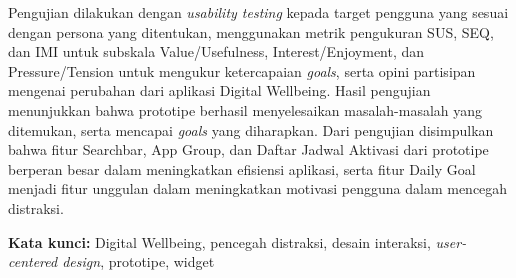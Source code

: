 \begin{singlespace}
  Pengujian dilakukan dengan \textit{usability testing} kepada target pengguna yang sesuai dengan persona yang ditentukan, menggunakan metrik pengukuran SUS, SEQ, dan IMI untuk subskala Value/Usefulness, Interest/Enjoyment, dan Pressure/Tension untuk mengukur ketercapaian \textit{goals}, serta opini partisipan mengenai perubahan dari aplikasi Digital Wellbeing.
  Hasil pengujian menunjukkan bahwa prototipe berhasil menyelesaikan masalah-masalah yang ditemukan, serta mencapai \textit{goals} yang diharapkan.
  Dari pengujian disimpulkan bahwa fitur Searchbar, App Group, dan Daftar Jadwal Aktivasi dari prototipe berperan besar dalam meningkatkan efisiensi aplikasi, serta fitur Daily Goal menjadi fitur unggulan dalam meningkatkan motivasi pengguna dalam mencegah distraksi.

\noindent \textbf{Kata kunci:} Digital Wellbeing, pencegah distraksi, desain interaksi, \textit{user-centered design}, prototipe, widget
\end{singlespace}